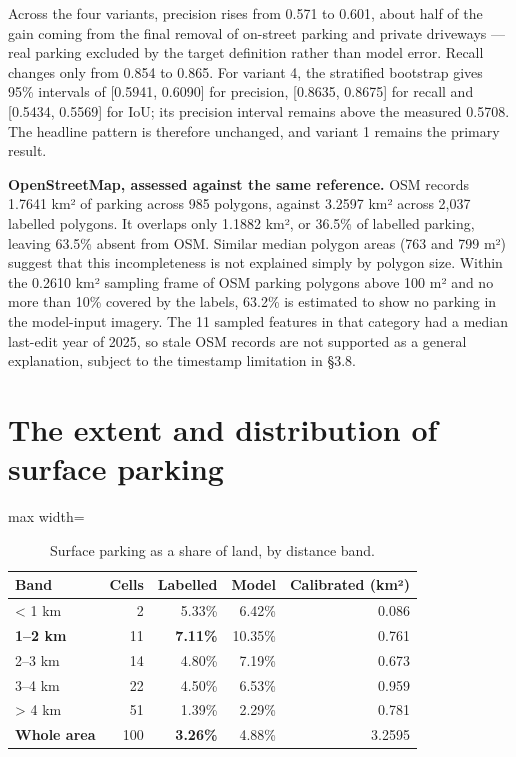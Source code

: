 Across the four variants, precision rises from 0.571 to 0.601, about half of the gain coming from the final removal of on-street parking and private driveways --- real parking excluded by the target definition rather than model error. Recall changes only from 0.854 to 0.865. For variant 4, the stratified bootstrap gives 95\% intervals of {[}0.5941, 0.6090{]} for precision, {[}0.8635, 0.8675{]} for recall and {[}0.5434, 0.5569{]} for IoU; its precision interval remains above the measured 0.5708. The headline pattern is therefore unchanged, and variant 1 remains the primary result.

\textbf{OpenStreetMap, assessed against the same reference.} OSM records 1.7641 km² of parking across 985 polygons, against 3.2597 km² across 2,037 labelled polygons. It overlaps only 1.1882 km², or 36.5\% of labelled parking, leaving 63.5\% absent from OSM. Similar median polygon areas (763 and 799 m²) suggest that this incompleteness is not explained simply by polygon size. Within the 0.2610 km² sampling frame of OSM parking polygons above 100 m² and no more than 10\% covered by the labels, 63.2\% is estimated to show no parking in the model-input imagery. The 11 sampled features in that category had a median last-edit year of 2025, so stale OSM records are not supported as a general explanation, subject to the timestamp limitation in §3.8.

\hypertarget{the-extent-and-distribution-of-surface-parking}{%
\section{The extent and distribution of surface parking}\label{the-extent-and-distribution-of-surface-parking}}

\begin{table}[htbp]
\centering
\caption{Surface parking as a share of land, by distance band.}\label{tab:4.9}
\begin{adjustbox}{max width=\textwidth}
\begin{tabular}{@{}lrrrr@{}}
\toprule
Band & Cells & Labelled & Model & Calibrated (km²) \\
\midrule
\textless{} 1 km & 2 & 5.33\% & 6.42\% & 0.086 \\
\textbf{1--2 km} & 11 & \textbf{7.11\%} & 10.35\% & 0.761 \\
2--3 km & 14 & 4.80\% & 7.19\% & 0.673 \\
3--4 km & 22 & 4.50\% & 6.53\% & 0.959 \\
\textgreater{} 4 km & 51 & 1.39\% & 2.29\% & 0.781 \\
\textbf{Whole area} & 100 & \textbf{3.26\%} & 4.88\% & 3.2595 \\
\bottomrule
\end{tabular}
\end{adjustbox}
\end{table}
\restoreparskip

